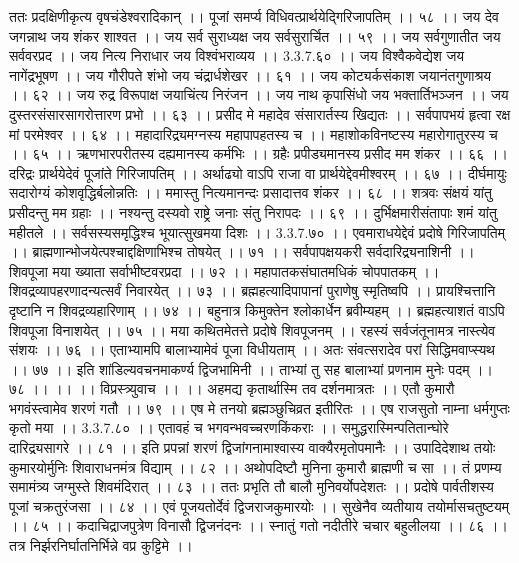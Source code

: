 ततः प्रदक्षिणीकृत्य वृषचंडेश्वरादिकान् ।।
पूजां समर्प्य विधिवत्प्रार्थयेद्गिरिजापतिम् ।। ५८ ।।
जय देव जगन्नाथ जय शंकर शाश्वत ।।
जय सर्व सुराध्यक्ष जय सर्वसुरार्चित ।। ५९ ।।
जय सर्वगुणातीत जय सर्ववरप्रद ।।
जय नित्य निराधार जय विश्वंभराव्यय ।। 3.3.7.६० ।।
जय विश्वैकवेद्येश जय नागेंद्रभूषण ।।
जय गौरीपते शंभो जय चंद्रार्धशेखर ।। ६१ ।।
जय कोट्यर्कसंकाश जयानंतगुणाश्रय ।। ६२ ।।
जय रुद्र विरूपाक्ष जयाचिंत्य निरंजन ।।
जय नाथ कृपासिंधो जय भक्तार्तिभञ्जन ।।
जय दुस्तरसंसारसागरोत्तारण प्रभो ।। ६३ ।।
प्रसीद मे महादेव संसारार्तस्य खिद्यतः ।।
सर्वपापभयं हृत्वा रक्ष मां परमेश्वर ।। ६४ ।।
महादारिद्र्यमग्नस्य महापापहतस्य च ।।
महाशोकविनष्टस्य महारोगातुरस्य च ।। ६५ ।।
ऋणभारपरीतस्य दह्यमानस्य कर्मभिः ।।
ग्रहैः प्रपीड्यमानस्य प्रसीद मम शंकर ।। ६६ ।।
दरिद्रः प्रार्थयेदेवं पूजांते गिरिजापतिम् ।।
अर्थाढ्यो वाऽपि राजा वा प्रार्थयेद्देवमीश्वरम् ।। ६७ ।।
दीर्घमायुः सदारोग्यं कोशवृद्धिर्बलोन्नतिः ।।
ममास्तु नित्यमानन्दः प्रसादात्तव शंकर ।। ६८ ।।
शत्रवः संक्षयं यांतु प्रसीदन्तु मम ग्रहाः ।।
नश्यन्तु दस्यवो राष्ट्रे जनाः संतु निरापदः ।। ६९ ।।
दुर्भिक्षमारीसंतापाः शमं यांतु महीतले ।।
सर्वसस्यसमृद्धिश्च भूयात्सुखमया दिशः ।। 3.3.7.७० ।।
एवमाराधयेद्देवं प्रदोषे गिरिजापतिम् ।।
ब्राह्मणान्भोजयेत्पश्चाद्दक्षिणाभिश्च तोषयेत् ।। ७१ ।।
सर्वपापक्षयकरी सर्वदारिद्र्यनाशिनी ।।
शिवपूजा मया ख्याता सर्वाभीष्टवरप्रदा ।। ७२ ।।
महापातकसंघातमधिकं चोपपातकम् ।।
शिवद्रव्यापहरणादन्यत्सर्वं निवारयेत् ।। ७३ ।।
ब्रह्महत्यादिपापानां पुराणेषु स्मृतिष्वपि ।।
प्रायश्चित्तानि दृष्टानि न शिवद्रव्यहारिणाम् ।। ७४ ।।
बहुनात्र किमुक्तेन श्लोकार्धेन ब्रवीम्यहम् ।।
ब्रह्महत्याशतं वाऽपि शिवपूजा विनाशयेत् ।। ७५ ।।
मया कथितमेतत्ते प्रदोषे शिवपूजनम् ।।
रहस्यं सर्वजंतूनामत्र नास्त्येव संशयः ।। ७६ ।।
एताभ्यामपि बालाभ्यामेवं पूजा विधीयताम् ।।
अतः संवत्सरादेव परां सिद्धिमवाप्स्यथ ।। ७७ ।।
इति शांडिल्यवचनमाकर्ण्य द्विजभामिनी ।।
ताभ्यां तु सह बालाभ्यां प्रणनाम मुनेः पदम् ।। ७८ ।। ।।
।। विप्रस्त्र्युवाच ।। ।।
अहमद्य कृतार्थास्मि तव दर्शनमात्रतः ।।
एतौ कुमारौ भगवंस्त्वामेव शरणं गतौ ।। ७९ ।।
एष मे तनयो ब्रह्मञ्छुचिव्रत इतीरितः ।।
एष राजसुतो नाम्ना धर्मगुप्तः कृतो मया ।। 3.3.7.८० ।।
एतावहं च भगवन्भवच्चरणकिंकराः ।।
समुद्धरास्मिन्पतितान्घोरे दारिद्र्यसागरे ।। ८१ ।।
इति प्रपन्नां शरणं द्विजांगनामाश्वास्य वाक्यैरमृतोपमानैः ।।
उपादिदेशाथ तयोः कुमारयोर्मुनिः शिवाराधनमंत्र विद्याम् ।। ८२ ।।
अथोपदिष्टौ मुनिना कुमारौ ब्राह्मणी च सा ।।
तं प्रणम्य समामंत्र्य जग्मुस्ते शिवमंदिरात् ।। ८३ ।।
ततः प्रभृति तौ बालौ मुनिवर्योपदेशतः ।।
प्रदोषे पार्वतीशस्य पूजां चक्रतुरंजसा ।। ८४ ।।
एवं पूजयतोर्देवं द्विजराजकुमारयोः ।।
सुखेनैव व्यतीयाय तयोर्मासचतुष्टयम् ।। ८५ ।।
कदाचिद्राजपुत्रेण विनासौ द्विजनंदनः ।।
स्नातुं गतो नदीतीरे चचार बहुलीलया ।। ८६ ।।
तत्र निर्झरनिर्घातनिर्भिन्ने वप्र कुट्टिमे ।।
